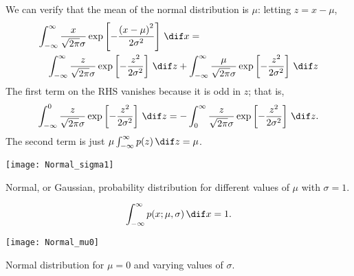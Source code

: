 We can verify that the mean of the normal distribution is $\mu$: letting $z = x-\mu$,
\begin{eqnarray*}
\lefteqn{\int_{-\infty}^{\infty} \frac{x}{\sqrt{2\pi}\sigma} \exp\left[-\frac{\left(x-\mu\right)^{2}}{2\sigma^{2}}\right] \,\dif x = }  \\
	&& \int_{-\infty}^{\infty} \frac{z}{\sqrt{2\pi}\sigma} \exp\left[-\frac{z^{2}}{2\sigma^{2}}\right] \,\dif z + \int_{-\infty}^{\infty} \frac{\mu}{\sqrt{2\pi}\sigma} \exp\left[-\frac{z^{2}}{2\sigma^{2}}\right] \,\dif z 
\end{eqnarray*}
The first term on the RHS vanishes because it is odd in $z$; that is,
\[ 
	\int_{-\infty}^{0} \frac{z}{\sqrt{2\pi}\sigma} \exp\left[-\frac{z^{2}}{2\sigma^{2}}\right] \,\dif z = -\int_{0}^{\infty} \frac{z}{\sqrt{2\pi}\sigma} \exp\left[-\frac{z^{2}}{2\sigma^{2}}\right] \,\dif z.
\]
The second term is just $\mu \int_{-\infty}^{\infty} p(z)\,\dif z = \mu$.
\begin{marginfigure}
\texttt{[image: Normal\_sigma1]}
\caption[Normal distributions with different means]{Normal, or Gaussian, probability distribution for different values of $\mu$ with $\sigma=1$.}
\label{f.Normal-vary-mu}
\end{marginfigure}
\[ \int_{-\infty}^{\infty}p(x;\mu,\sigma)\,\dif x = 1. \]

\begin{marginfigure}
\texttt{[image: Normal\_mu0]}
\caption[Normal distributions with different standard deviations]{Normal distribution for $\mu=0$ and varying values of $\sigma$.}
\label{f.Normal-vary-sigma}
\end{marginfigure}

